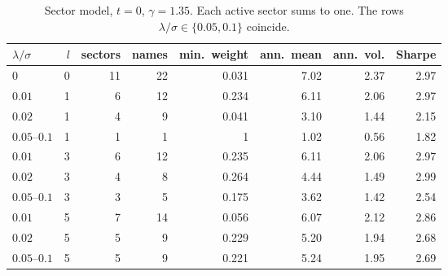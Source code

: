 \documentclass[11pt,a4paper]{article}
\theoremstyle{plain}
\theoremstyle{definition}
\theoremstyle{remark}
\begin{document}
\begin{table}[ht]
  \centering
  \setlength{\belowcaptionskip}{10pt}
  \caption{Sector model, \(t=0\), \(\gamma=1.35\).
    Each active sector sums to one.
    The rows \(\lambda/\sigma\in\{0.05,0.1\}\) coincide.
  }
  \label{tab:sector-t0}
  \small
  \begin{tabular}{@{}lrrrrrrr@{}}
    \toprule
    \(\lambda/\sigma\) & \(l\) & sectors & names & min.\ weight & ann.\ mean & ann.\ vol. & Sharpe \\
    \midrule
    \(0\)              & \(0\) & 11      & 22    & 0.031        & 7.02       & 2.37       & 2.97   \\
    \(0.01\)           & 1     & 6       & 12    & 0.234        & 6.11       & 2.06       & 2.97   \\
    \(0.02\)           & 1     & 4       & 9     & 0.041        & 3.10       & 1.44       & 2.15   \\
    \(0.05\)--\(0.1\)  & 1     & 1       & 1     & 1            & 1.02       & 0.56       & 1.82   \\
    \(0.01\)           & 3     & 6       & 12    & 0.235        & 6.11       & 2.06       & 2.97   \\
    \(0.02\)           & 3     & 4       & 8     & 0.264        & 4.44       & 1.49       & 2.99   \\
    \(0.05\)--\(0.1\)  & 3     & 3       & 5     & 0.175        & 3.62       & 1.42       & 2.54   \\
    \(0.01\)           & 5     & 7       & 14    & 0.056        & 6.07       & 2.12       & 2.86   \\
    \(0.02\)           & 5     & 5       & 9     & 0.229        & 5.20       & 1.94       & 2.68   \\
    \(0.05\)--\(0.1\)  & 5     & 5       & 9     & 0.221        & 5.24       & 1.95       & 2.69   \\
    \bottomrule
  \end{tabular}
\end{table}
\end{document}
